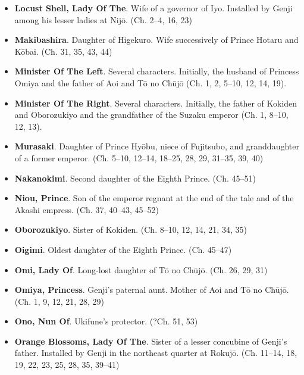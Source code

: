 \documentclass{article}
\begin{document}
\begin{multicols}{2}
\begin{itemize}[
			label=,
			leftmargin=0em,
			rightmargin=-1.5em,
			itemindent=-2em,
			nosep,
		]
		\item \textbf{Locust Shell, Lady Of The}. Wife of a governor of Iyo. Installed by Genji among his lesser ladies at Nijō. (Ch. 2--4, 16, 23)

		\item \textbf{Makibashira}. Daughter of Higekuro. Wife successively of Prince Hotaru and Kōbai. (Ch. 31, 35, 43, 44)

		\item \textbf{Minister Of The Left}. Several characters. Initially, the husband of Princess Omiya and the father of Aoi and Tō no Chūjō (Ch. 1, 2, 5--10, 12, 14, 19).

		\item \textbf{Minister Of The Right}. Several characters. Initially, the father of Kokiden and Oborozukiyo and the grandfather of the Suzaku emperor (Ch. 1, 8--10, 12, 13).

		\item \textbf{Murasaki}. Daughter of Prince Hyōbu, niece of Fujitsubo, and granddaughter of a former emperor. (Ch. 5--10, 12--14, 18--25, 28, 29, 31--35, 39, 40)

		\item \textbf{Nakanokimi}. Second daughter of the Eighth Prince. (Ch. 45--51)

		\item \textbf{Niou, Prince}. Son of the emperor regnant at the end of the tale and of the Akashi empress. (Ch. 37, 40--43, 45--52)

		\item \textbf{Oborozukiyo}. Sister of Kokiden. (Ch. 8--10, 12, 14, 21, 34, 35)

		\item \textbf{Oigimi}. Oldest daughter of the Eighth Prince. (Ch. 45--47)
		
		\item \textbf{Omi, Lady Of}. Long-lost daughter of Tō no Chūjō. (Ch. 26, 29, 31)

		\item \textbf{Omiya, Princess}. Genji's paternal aunt. Mother of Aoi and Tō no Chūjō. (Ch. 1, 9, 12, 21, 28, 29)

		\item \textbf{Ono, Nun Of}. Ukifune's protector. (?Ch. 51, 53)

		\item \textbf{Orange Blossoms, Lady Of The}. Sister of a lesser concubine of Genji's father. Installed by Genji in the northeast quarter at Rokujō. (Ch. 11--14, 18, 19, 22, 23, 25, 28, 35, 39--41)


\end{itemize}
\end{multicols}
\end{document}
